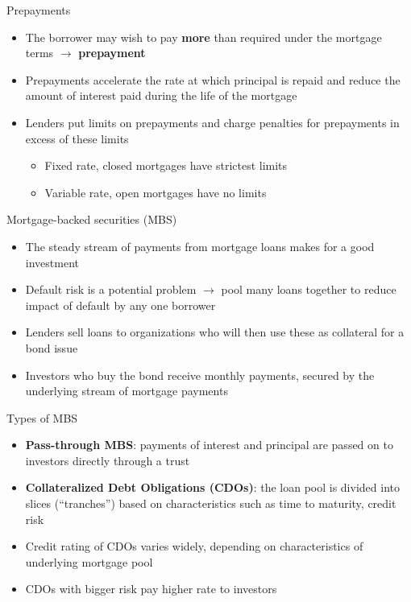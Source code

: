 \documentclass{beamer}
\begin{document}
\begin{frame}{Prepayments}

\begin{itemize}
\item The borrower may wish to pay \textbf{more} than required under the mortgage terms $\rightarrow$ \textbf{prepayment}
\item Prepayments accelerate the rate at which principal is repaid and reduce the amount of interest paid during the life of the mortgage
\item Lenders put limits on prepayments and charge penalties for prepayments in excess of these limits
  \begin{itemize}
  \item Fixed rate, closed mortgages have strictest limits
  \item Variable rate, open mortgages have no limits
  \end{itemize}
\end{itemize}

\end{frame}

\begin{frame}{Mortgage-backed securities (MBS)}

\begin{itemize}
\item The steady stream of payments from mortgage loans makes for a good investment
\item Default risk is a potential problem $\rightarrow$ pool many loans together to reduce impact of default by any one borrower
\item Lenders sell loans to organizations who will then use these as collateral for a bond issue
\item Investors who buy the bond receive monthly payments, secured by the underlying stream of mortgage payments
\end{itemize}

\end{frame}

\begin{frame}{Types of MBS}

\begin{itemize}
\item \textbf{Pass-through MBS}: payments of interest and principal are passed on to investors directly through a trust
\item \textbf{Collateralized Debt Obligations (CDOs)}: the loan pool is divided into slices (``tranches'') based on characteristics such as time to maturity, credit risk
\item Credit rating of CDOs varies widely, depending on characteristics of underlying mortgage pool
\item CDOs with bigger risk pay higher rate to investors
\end{itemize}

\end{frame}
\end{document}
